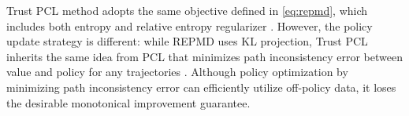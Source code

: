 Trust PCL method adopts the same objective defined in \cref{eq:repmd}, which includes both entropy and relative entropy regularizer \citep{nachum2017trust}. However, the policy update strategy is different: while REPMD uses KL projection, Trust PCL inherits the same idea from PCL that minimizes path inconsistency error between value and policy for any trajectories \citep{nachum2017bridging}. Although policy optimization by minimizing path inconsistency error can efficiently utilize off-policy data, it loses the desirable monotonical improvement guarantee.






